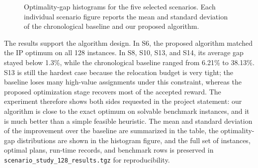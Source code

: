 \documentclass[10pt,a4paper]{article}
\begin{document}
\begin{figure}[ht]
\centering
\begin{minipage}{0.44\textwidth}
\centering

\end{minipage}\hfill
\begin{minipage}{0.44\textwidth}
\centering

\end{minipage}

\vspace{0.3em}
\begin{minipage}{0.44\textwidth}
\centering

\end{minipage}\hfill
\begin{minipage}{0.44\textwidth}
\centering

\end{minipage}

\vspace{0.3em}
\begin{minipage}{0.44\textwidth}
\centering

\end{minipage}
\caption{Optimality-gap histograms for the five selected scenarios.  Each
individual scenario figure reports the mean and standard deviation of the
chronological baseline and our proposed algorithm.}
\end{figure}

The results support the algorithm design.  In S6, the proposed algorithm matched
the IP optimum on all 128 instances.  In S8, S10, S13, and S14, its average gap
stayed below 1.3\%, while the chronological baseline ranged from 6.21\% to
38.13\%.  S13 is still the hardest case because the relocation budget is very
tight; the baseline loses many high-value assignments under this constraint,
whereas the proposed optimization stage recovers most of the accepted reward.
The experiment therefore shows both sides requested in the project statement:
our algorithm is close to the exact optimum on solvable benchmark instances,
and it is much better than a simple feasible heuristic.  The mean and standard
deviation of the improvement over the baseline are summarized in the table, the
optimality-gap distributions are shown in the histogram figure, and the full set
of instances, optimal plans, run-time records, and benchmark rows is preserved in
\texttt{scenario\_study\_128\_results.tgz} for reproducibility.
\end{document}
